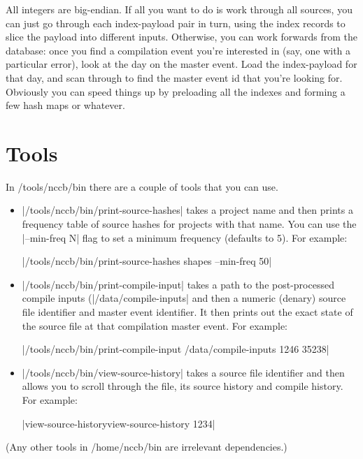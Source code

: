 \documentclass{report}
\begin{document}
All integers are big-endian.  If all you want to do is work
through all sources, you can just go through each index-payload pair
in turn, using the index records to slice the payload into different
inputs.  Otherwise, you can work forwards from the database: once you
find a compilation event you're interested in (say, one with a
particular error), look at the day on the master event.  Load the
index-payload for that day, and scan through to find the master event
id that you're looking for.  Obviously you can speed things up by
preloading all the indexes and forming a few hash maps or whatever.

\section{Tools}

In /tools/nccb/bin there are a couple of tools that you can use.

\begin{itemize}
\item |/tools/nccb/bin/print-source-hashes| takes a project name and then prints
a frequency table of source hashes for projects with that name.  You can use the
|--min-freq N| flag to set a minimum frequency (defaults to 5).
For example:

|/tools/nccb/bin/print-source-hashes shapes --min-freq 50|

\item |/tools/nccb/bin/print-compile-input| takes a path to the post-processed compile inputs
(|/data/compile-inputs| and then a numeric (denary) source file identifier and master event
identifier.  It then prints out the exact state of the source file at that compilation master
event.  For example:

|/tools/nccb/bin/print-compile-input /data/compile-inputs 1246 35238|

\item |/tools/nccb/bin/view-source-history| takes a source file identifier and then
allows you to scroll through the file, its source history and compile history.  For example:

|view-source-historyview-source-history 1234|

\end{itemize}
(Any other tools in /home/nccb/bin are irrelevant dependencies.)
\end{document}
